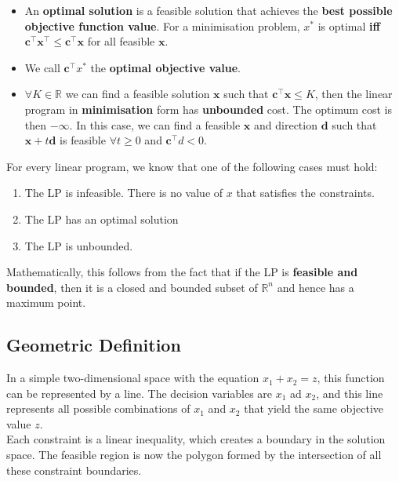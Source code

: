 \documentclass{article}
\begin{document}
\begin{definition}
\begin{itemize}
        \item An \textbf{optimal solution} is a feasible solution that achieves the \textbf{best possible objective function value}. For a minimisation problem, $x^{*}$ is optimal \textbf{iff} $\mathbf{c}^{\top} \mathbf{x^{\top}} \leq \mathbf{c}^{\top} \mathbf{x}$ for all feasible $\mathbf{x}$. 
        \item We call $\mathbf{c}^{\top} x^{*}$ the \textbf{optimal objective value}. 
        \item $\forall K \in \mathbb{R}$ we can find a feasible solution $\mathbf{x}$ such that $\mathbf{c}^{\top}\mathbf{x} \leq K$, then the linear program in \textbf{minimisation} form has \textbf{unbounded} cost. The optimum cost is then $-\infty$. In this case, we can find a feasible $\mathbf{x}$ and direction $\mathbf{d}$ such that $\mathbf{x} + t \mathbf{d}$ is feasible $\forall t \geq 0$ and $\mathbf{c}^{\top}d < 0$.
    \end{itemize}    
\end{definition}

\noindent For every linear program, we know that one of the following cases must hold:

\begin{enumerate}
    \item The LP is infeasible. There is no value of $x$ that satisfies the constraints. 
    \item The LP has an optimal solution
    \item The LP is unbounded. 
\end{enumerate}

\noindent Mathematically, this follows from the fact that if the LP is \textbf{feasible and bounded}, then it is a closed and bounded subset of $\mathbb{R}^{n}$ and hence has a maximum point. 

\subsection{Geometric Definition}

In a simple two-dimensional space with the equation $x_{1} + x_{2} = z$, this function can be represented by a line. The decision variables are $x_{1}$ ad $x_{2}$, and this line represents all possible combinations of $x_{1}$ and $x_{2}$ that yield the same objective value $z$. \\ 

\noindent Each constraint is a linear inequality, which creates a boundary in the solution space. The feasible region is now the polygon formed by the intersection of all these constraint boundaries. \\
\end{document}
